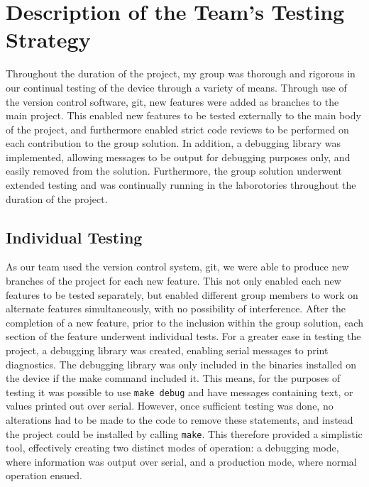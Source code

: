 \section{Description of the Team's Testing Strategy}

Throughout the duration of the project, my group was thorough and rigorous in our 
continual testing of the device through a variety of means. Through use of the 
version control software, git, new features were added as branches to the main
project. This enabled new features to be tested externally to the main body of 
the project, and furthermore enabled strict code reviews to be performed on each 
contribution to the group solution. 
In addition, a debugging library was implemented, allowing messages to be 
output for debugging purposes only, and easily removed from the solution. 
Furthermore, the group solution underwent extended testing and was continually 
running in the laborotories throughout the duration of the project. 

\subsection*{Individual Testing}

As our team used the version control system, git, we were able to produce new 
branches of the project for each new feature. 
This not only enabled each new features to be tested separately, but enabled 
different group members to work on alternate features simultaneously, with no 
possibility of interference. 
After the completion of a new feature, prior to the inclusion within the group 
solution, each section of the feature underwent individual tests. 
For a greater ease in testing the project,  a debugging library was created, 
enabling serial messages to print diagnostics. 
The debugging library was only included in the 
binaries installed on the device if the make command included it. This 
means, for the purposes of testing it was possible to use \texttt{make debug} 
and have messages containing text, or values printed out over serial. 
However, once sufficient testing was done, no 
alterations had to be made to the code to remove these statements, and 
instead the project could be installed by calling \texttt{make}. 
This therefore provided a simplistic tool, effectively creating two distinct 
modes of operation: a debugging mode, where information was output over serial, 
and a production mode, where normal operation ensued. 

